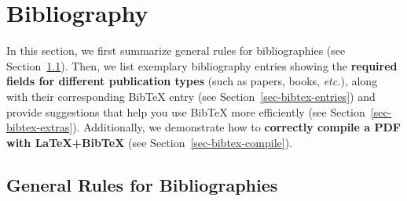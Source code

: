 \documentclass[11pt,a4paper]{article}
\begin{document}
\newpage
\section{Bibliography}
\label{sec-bibtex}

In this section, we first summarize general rules for bibliographies (see Section~\ref{sec-bibtex-general}).
Then, we list exemplary bibliography entries showing the \textbf{required fields for different publication types} (such as papers, books, \emph{etc.}), along with their corresponding BibTeX entry (see Section~\ref{sec-bibtex-entries}) and provide suggestions that help you use BibTeX more efficiently (see Section~\ref{sec-bibtex-extras}).
Additionally, we demonstrate how to \textbf{correctly compile a PDF with \LaTeX+BibTeX} (see Section~\ref{sec-bibtex-compile}).


\subsection{General Rules for Bibliographies}
\label{sec-bibtex-general}
\end{document}
